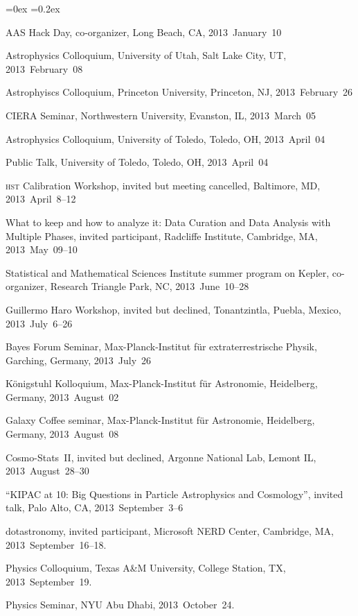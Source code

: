 \documentclass[12pt,letterpaper]{article}
\newcounter{refpubnum}
\newcommand{\hogglist}{%
    \rightmargin=0in
    \leftmargin=0.18in
    \topsep=0ex
    \partopsep=0pt
    \itemsep=0.2ex
    \parsep=0pt
    \itemindent=-1.0\leftmargin
    \listparindent=0.0\leftmargin
    \settowidth{\labelsep}{~}
    \usecounter{refpubnum}
  }
\begin{document}
\begin{list}{}{\hogglist}
{\item AAS Hack Day, co-organizer,
          Long Beach, CA, 2013~January~10
\item Astrophysics Colloquium, University of Utah,
          Salt Lake City, UT, 2013~February~08
\item Astrophyiscs Colloquium, Princeton University,
          Princeton, NJ, 2013~February~26
\item CIERA Seminar, Northwestern University,
          Evanston, IL, 2013~March~05
\item Astrophysics Colloquium, University of Toledo,
          Toledo, OH, 2013~April~04
\item Public Talk, University of Toledo,
          Toledo, OH, 2013~April~04
\item \textsc{hst} Calibration Workshop, invited but meeting cancelled,
          Baltimore, MD, 2013~April~8--12
\item What to keep and how to analyze it: Data Curation and Data Analysis with Multiple Phases, invited participant,
          Radcliffe Institute, Cambridge, MA, 2013~May~09--10
\item Statistical and Mathematical Sciences Institute summer program on Kepler, co-organizer,
          Research Triangle Park, NC, 2013~June~10--28
\item Guillermo Haro Workshop, invited but declined,
          Tonantzintla, Puebla, Mexico, 2013~July~6--26
\item Bayes Forum Seminar, Max-Planck-Institut f\"ur extraterrestrische Physik,
          Garching, Germany, 2013~July~26
\item K\"onigstuhl Kolloquium, Max-Planck-Institut f\"ur Astronomie,
          Heidelberg, Germany, 2013~August~02
\item Galaxy Coffee seminar, Max-Planck-Institut f\"ur Astronomie,
          Heidelberg, Germany, 2013~August~08
\item Cosmo-Stats~II, invited but declined,
          Argonne National Lab, Lemont IL, 2013~August~28--30
\item ``KIPAC at 10: Big Questions in Particle Astrophysics and Cosmology'', invited talk,
          Palo Alto, CA, 2013~September~3--6
\item dotastronomy, invited participant, Microsoft NERD Center,
          Cambridge, MA, 2013~September~16--18.
\item Physics Colloquium, Texas A&M University, 
          College Station, TX, 2013~September~19.
\item Physics Seminar, NYU Abu Dhabi, 2013~October~24.
}
\end{list}
\end{document}
